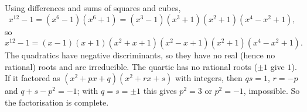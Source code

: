 Using differences and sums of squares and cubes,
\[x^{12}-1=\left(x^6-1\right)\left(x^6+1\right)=\left(x^3-1\right)\left(x^3+1\right)\left(x^2+1\right)\left(x^4-x^2+1\right),\]
so
\[\boxed{x^{12}-1=(x-1)(x+1)\left(x^2+x+1\right)\left(x^2-x+1\right)\left(x^2+1\right)\left(x^4-x^2+1\right)}.\]
The quadratics have negative discriminants, so they have no real (hence no rational) roots and are irreducible. The quartic has no rational roots ($\pm1$ give $1$). If it factored as $\left(x^2+px+q\right)\left(x^2+rx+s\right)$ with integers, then $qs=1$, $r=-p$ and $q+s-p^2=-1$; with $q=s=\pm1$ this gives $p^2=3$ or $p^2=-1$, impossible. So the factorisation is complete.
